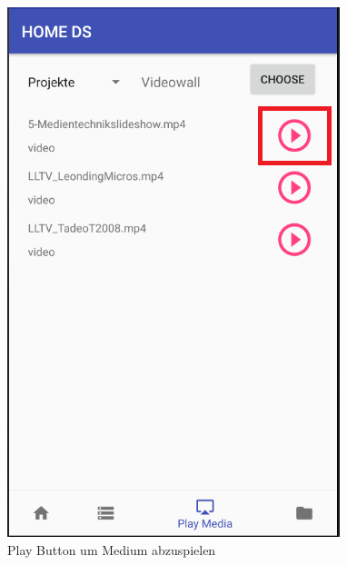 \begin{figure}[H]
\centering
\includegraphics[scale=0.35]{images/06_AndroidApp/06_playMedia}
\caption{Play Button um Medium abzuspielen}
\label{fig:mediaNav}
\end{figure}
\\
